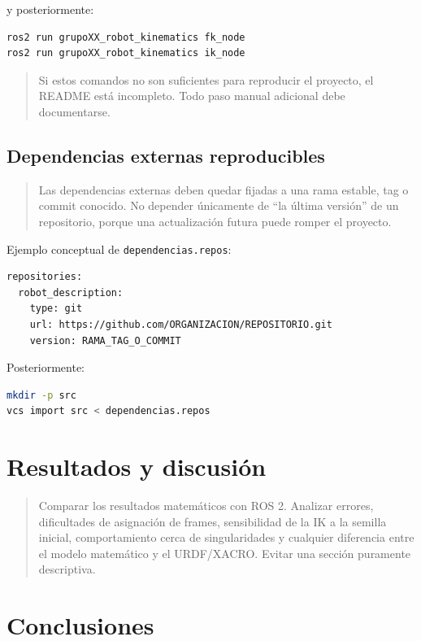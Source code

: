 \documentclass[journal]{IEEEtran}
\newcommand{\instr}[1]{%
\begin{quote}
\small
\noindent\textbf{\color{blue}{INSTRUCCIÓN:}} #1
\end{quote}
}
\newcommand{\pendiente}[1]{\textbf{\color{red}{[#1]}}}
\begin{document}
y posteriormente:

\begin{lstlisting}[language=bash]
ros2 run grupoXX_robot_kinematics fk_node
ros2 run grupoXX_robot_kinematics ik_node
\end{lstlisting}

\instr{Si estos comandos no son suficientes para reproducir el proyecto, el README está incompleto. Todo paso manual adicional debe documentarse.}

\subsection{Dependencias externas reproducibles}

\instr{Las dependencias externas deben quedar fijadas a una rama estable, tag o commit conocido. No depender únicamente de ``la última versión'' de un repositorio, porque una actualización futura puede romper el proyecto.}

Ejemplo conceptual de \texttt{dependencias.repos}:

\begin{lstlisting}
repositories:
  robot_description:
    type: git
    url: https://github.com/ORGANIZACION/REPOSITORIO.git
    version: RAMA_TAG_O_COMMIT
\end{lstlisting}

Posteriormente:

\begin{lstlisting}[language=bash]
mkdir -p src
vcs import src < dependencias.repos
\end{lstlisting}

\section{Resultados y discusión}

\instr{Comparar los resultados matemáticos con ROS 2. Analizar errores, dificultades de asignación de frames, sensibilidad de la IK a la semilla inicial, comportamiento cerca de singularidades y cualquier diferencia entre el modelo matemático y el URDF/XACRO. Evitar una sección puramente descriptiva.}

\pendiente{DESARROLLO DEL GRUPO.}

\section{Conclusiones}
\end{document}
